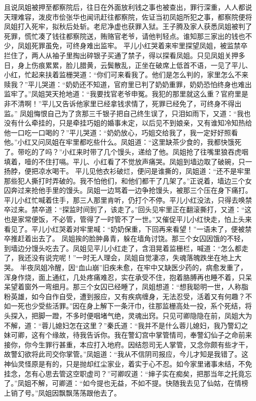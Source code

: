 \documentclass[12pt,oneside]{book}
\begin{document}
且说凤姐被押至都察院后，往日在外面放利钱之事也被查出，罪行深重，人人都说天理难容，泼皮市侩张华也闻讯赶往都察院，佐证当初凤姐所犯之事，都察院便将凤姐打入死牢，拟秋后处斩。老尼净虚也获罪入狱。王子腾及家人获悉凤姐被判了死罪，慌忙凑了钱往都察院送，贿赂官老爷，请他判轻点。谁知那三家出的钱也不少，凤姐死罪虽免，可终身难出监牢。
平儿小红哭着来牢里探望凤姐，被监禁卒拦住了，两人从袖子里掏出碎银子买通了禁子，得以探看凤姐。只见凤姐关押多日，身上伤痕累累，脸儿腊黄，云鬓散乱，正坐在破席上低首不语，一见了平儿、小红，忙起来扶着监栅哭道：“你们可来看我了。他们是怎么判的，家里怎么不来赎我？”平儿哭道：“奶奶还不知道，官府里已判了奶奶重罪，奶奶恐怕终身也难出监牢了。”凤姐哭天抢地道：“我要找官老爷申冤。我犯的那里就这么重？官府里是非不清啊！”平儿又告诉他家里已经拿钱求情了，死罪已经免了，可终身不得出监。”
凤姐悔恨自己为了贪那三千银子把自己终生误了，只泪如雨下，又道：“我也没有什么牵挂的，只是牵挂巧姐的婚事未定，以后见不到娘亲，又有谁知冷知热给他一口吃一口喝的？”平儿哭道：“奶奶放心，巧姐交给我了，我一定好好照看他。”小红又问凤姐在牢里都吃些什么。凤姐道：“这里缺茶少食的，我都快饿死了。带吃的了吗？”小红来时带了几个馒头，递给了他。凤姐抢了往嘴里狼吞虎咽填着，噎的不住打嗝。平儿、小红看了不觉放声痛哭。凤姐到墙边取了破碗，只一扬脖，便把凉水喝干。
平儿见他衣衫破烂，便问是谁撕的，凤姐道：“还不是牢里那些犯人撕打时弄破的。我不怕他们，和他们都干了几架了。”正说着，墙边三个女囚奔过来抢他手里的馒头。凤姐一边骂着一边争抢馒头，被那三个压在身下痛打。平儿小红忙喊着住手，那三人那里肯听，仍打个不停。平儿小红没法，只得去唤禁卒过来。禁卒道：“探监时间到了，该走了。”回头见牢里正在翻滚撕打，又道：“这也是家常便饭，不必管，管得了一时管不了一世。”又催促平儿小红快走，怕上头来看见了。平儿小红哭着对牢里喊：“奶奶保重，下回再来看望！”一语未了，便被禁卒推赶着出去了。
凤姐挨的脸肿鼻青，躲在墙角讨饶。那三个女囚因饿的不轻，到墙边分馒头吃去了。凤姐见平儿小红走了，含泪晃着监栅栏，喊道：“怎么都走了，我还没有说完呢！”一时无人理会，凤姐自觉凄凉，失魂落魄跌坐在地上大哭。
半夜凤姐冷醒，因“血山崩”旧疾未愈，在牢中又缺医少药的，病愈发重了，浑身作烧，面上通红，几处疼痛难忍，实在承受不住，抱着胳膊再也睡不着，只呆呆望着窗外一弯细月。那三个女囚已经睡了，凤姐想道：“想我聪明一世，人称脂粉英雄，如今自作自受，遭到报应，又有疾病缠身，无法忍受，活着又有何趣？不如一死也少受些活罪。”因在身上解下一条汗巾，往那监栅高处一投，系个死结，将头探入，把脚一蹬，不多时便咽堵气绝，灵魂出窍。只见可卿隐隐在前，凤姐大为不解，道：“蓉儿媳妇怎在这里？”秦氏道：“我并不是什么蓉儿媳妇，我乃警幻之妹可卿，这有个缘故，待我告诉你。我在警幻宫中掌管情司，奉警幻仙子之命前来接你，你今生罪行甚重，本应打入地府。因结怨司无人掌管，又念你颇有些才干，故警幻欲将此司交你掌管。”凤姐道：“我从不信阴司报应，今儿才知是我错了。这神仙灵怪原是有的，只是抛却红尘家业，着实于心不忍。如今家里诸事未结，不免挂念，怎有心思去管这空职虚司？”可卿叹道：“婶子实在痴矣，把那当年之托竟忘了。”凤姐不解，可卿道：“如今提也无益，不如不提。快随我去见了仙姑，在情榜上销了号。”凤姐因飘飘荡荡跟他去了。
\end{document}
